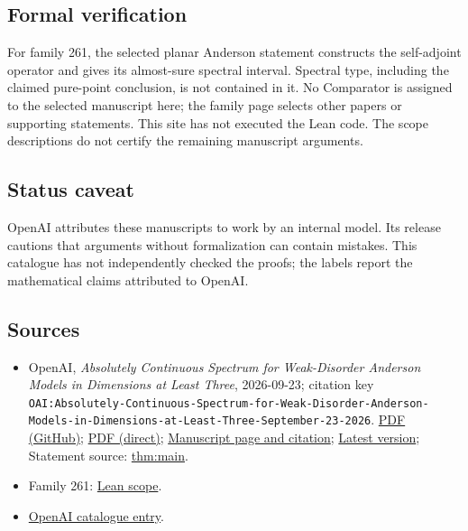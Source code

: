 \documentclass[11pt]{article}
\begin{document}
\subsection{Formal verification}
For family 261, the selected planar Anderson statement constructs the self-adjoint operator and gives its almost-sure spectral interval. Spectral type, including the claimed pure-point conclusion, is not contained in it. No Comparator is assigned to the selected manuscript here; the family page selects other papers or supporting statements. This site has not executed the Lean code. The scope descriptions do not certify the remaining manuscript arguments.

\subsection{Status caveat}
OpenAI attributes these manuscripts to work by an internal model. Its release cautions that arguments without formalization can contain mistakes. This catalogue has not independently checked the proofs; the labels report the mathematical claims attributed to OpenAI.

\subsection{Sources}
\begin{itemize}
\item OpenAI, \emph{Absolutely Continuous Spectrum for Weak-Disorder Anderson Models in Dimensions at Least Three}, 2026-09-23; citation key \texttt{OAI:Absolutely-Continuous-Spectrum-for-Weak-Disorder-Anderson-Models-in-Dimensions-at-Least-Three-September-23-2026}. \href{https://github.com/openai/math/blob/adc7f1241b42e322a6451854ab7e4b4c146bf78a/preprints/Absolutely-Continuous-Spectrum-for-Weak-Disorder-Anderson-Models-in-Dimensions-at-Least-Three-September-23-2026/paper.pdf}{PDF (GitHub)}; \href{https://github.com/openai/math/raw/adc7f1241b42e322a6451854ab7e4b4c146bf78a/preprints/Absolutely-Continuous-Spectrum-for-Weak-Disorder-Anderson-Models-in-Dimensions-at-Least-Three-September-23-2026/paper.pdf}{PDF (direct)}; \href{https://github.com/openai/math/blob/adc7f1241b42e322a6451854ab7e4b4c146bf78a/preprints/Absolutely-Continuous-Spectrum-for-Weak-Disorder-Anderson-Models-in-Dimensions-at-Least-Three-September-23-2026/README.md}{Manuscript page and citation}; \href{https://github.com/openai/math/blob/main/preprints/Absolutely-Continuous-Spectrum-for-Weak-Disorder-Anderson-Models-in-Dimensions-at-Least-Three-September-23-2026/paper.pdf}{Latest version}; Statement source: \href{https://github.com/openai/math/blob/adc7f1241b42e322a6451854ab7e4b4c146bf78a/preprints/Absolutely-Continuous-Spectrum-for-Weak-Disorder-Anderson-Models-in-Dimensions-at-Least-Three-September-23-2026/build/01-introduction.tex\#L33}{thm:main}.
\item Family 261: \href{https://github.com/openai/math/blob/adc7f1241b42e322a6451854ab7e4b4c146bf78a/lean/docs/261.md}{Lean scope}.
\item \href{https://github.com/openai/math/blob/adc7f1241b42e322a6451854ab7e4b4c146bf78a/CONTENTS.md}{OpenAI catalogue entry}.
\end{itemize}
\end{document}
